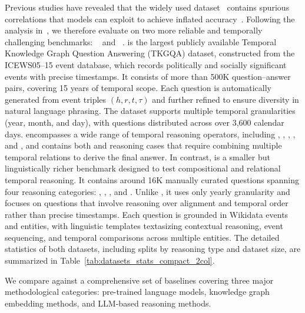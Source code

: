 \label{exp:Experiment datasets}
Previous studies have revealed that the widely used  dataset~\cite{minMultihopReadingComprehension2019} contains spurious correlations that models can exploit to achieve inflated accuracy~\cite{sharma2022twirgcn}. 
Following the analysis in~\cite{T4}, we therefore evaluate \mot on two more reliable and temporally challenging benchmarks: ~\cite{TKGQA} and ~\cite{jia2021complex}. 
 is the largest publicly available Temporal Knowledge Graph Question Answering (TKGQA) dataset, constructed from the ICEWS05–15 event database, which records politically and socially significant events with precise timestamps. 
It consists of more than 500K question–answer pairs, covering 15 years of temporal scope. 
Each question is automatically generated from event triples $(h, r, t, \tau)$ and further refined to ensure diversity in natural language phrasing. 
The dataset supports multiple temporal granularities (year, month, and day), with questions distributed across over 3,600 calendar days. 
 encompasses a wide range of temporal reasoning operators, including , , , , and , and contains both  and  reasoning cases that require combining multiple temporal relations to derive the final answer.
In contrast,  is a smaller but linguistically richer benchmark designed to test compositional and relational temporal reasoning. 
It contains around 16K manually curated questions spanning four reasoning categories: , , , and . 
Unlike , it uses only yearly granularity and focuses on questions that involve reasoning over alignment and temporal order rather than precise timestamps. 
Each question is grounded in Wikidata events and entities, with linguistic templates textasizing contextual reasoning, event sequencing, and temporal comparisons across multiple entities.
The detailed statistics of both datasets, including splits by reasoning type and dataset size, are summarized in Table~\ref{tab:datasets_stats_compact_2col}.


We compare \mot against a comprehensive set of baselines covering three major methodological categories: pre-trained language models, knowledge graph embedding methods, and LLM-based reasoning methods. 

